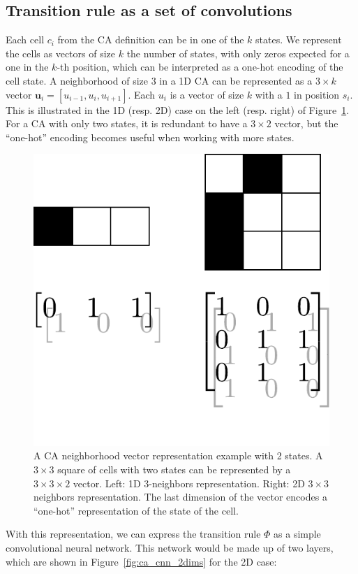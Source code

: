 \subsection{Transition rule as a set of convolutions\label{sec:transition-rule-as}}

Each cell $c_i$ from the \ac{CA} definition can be in one of the $k$ states. We
represent the cells as vectors of size $k$ the number of states, with only
zeros expected for a one in the $k$-th position, which can be interpreted as a 
one-hot encoding of the cell state. A neighborhood of size $3$ in a
1D CA can be represented as a $3 \times k$ vector
$\mathbf{u}_i = [u_{i-1}, u_{i}, u_{i+1}]$. Each $u_{i}$ is a vector of size $k$
with a $1$ in position $s_i$. This is illustrated in the 1D (resp. 2D) case on
the left (resp. right) of Figure~\ref{fig:cell}. For a CA with only two states,
it is redundant to have a $3 \times 2$ vector, but the ``one-hot'' encoding
becomes useful when working with more states.

\begin{figure}[htbp]
  \centering
  \includegraphics[width=.4\linewidth]{figures/repr}
  \caption{\label{fig:cell}A \ac{CA} neighborhood vector representation example
    with 2 states. A $3\times 3$ square of cells with two states can be represented
    by a $3\times 3 \times 2$ vector. Left: 1D 3-neighbors representation. Right: 2D $3\times3$
    neighbors representation. The last dimension of the vector encodes a
    ``one-hot'' representation of the state of the cell.}

\end{figure}

With this representation, we can express the transition rule $\Phi$ as a simple
convolutional neural network. This network would be made up of two layers, which
are shown in Figure~\ref{fig:ca_cnn_2dims} for the 2D case:

